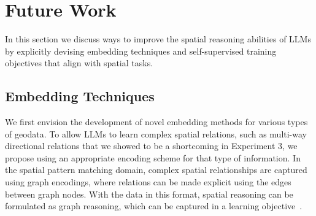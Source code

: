 \section{Future Work}
\label{section:future}

In this section we discuss ways to improve the spatial reasoning abilities of LLMs by explicitly devising embedding techniques and self-supervised training objectives that align with spatial tasks.

\subsection{Embedding Techniques}
We first envision the development of novel embedding methods for various types of geodata.
%
%
To allow LLMs to learn complex spatial relations, such as multi-way directional relations that we showed to be a shortcoming in Experiment 3, we propose using an appropriate encoding scheme for that type of information.
In the spatial pattern matching domain, complex spatial relationships are captured using graph encodings, where relations can be made explicit using the edges between graph nodes.
%
%
%
With the data in this format, spatial reasoning can be formulated as graph reasoning, which can be captured in a learning objective~\cite{Schneider2024}.

